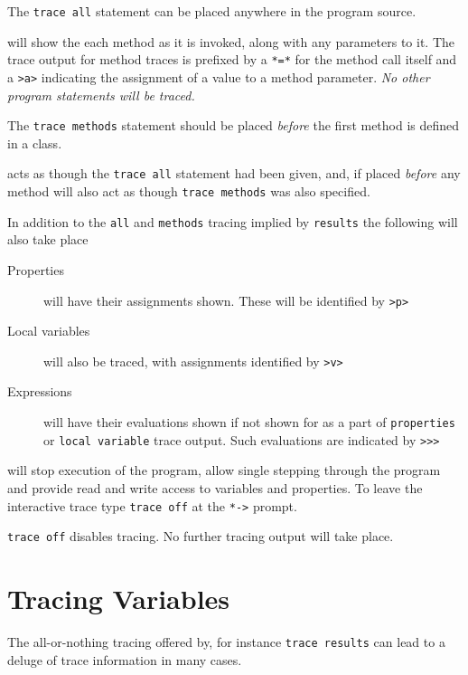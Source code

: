 {\begin{description}
The \texttt{trace all} statement can be placed anywhere in the program source. 

\item[\textbf{methods}] will show the each method as it is invoked, along with any parameters to it. The trace output for method traces is prefixed by a \texttt{*=*} for the method call itself and a \texttt{>a>} indicating the assignment of a value to a method parameter. \textit{No other program statements will be traced.}

The \texttt{trace methods} statement should be placed \textit{before} the first method is defined in a class.

\item[\textbf{results}] acts as though the \texttt{trace all} statement had been given, and, if placed \textit{before} any method will also act as though \texttt{trace methods} was also specified.

In addition to the \texttt{all} and \texttt{methods} tracing implied by \texttt{results} the following will also take place
\begin{description}

\item[Properties] will have their assignments shown. These will be identified by \texttt{>p>}

\item[Local variables] will also be traced, with assignments identified by \texttt{>v>}

\item[Expressions] will have their evaluations shown if not shown for as a part of \texttt{properties} or \texttt{local variable} trace output. Such evaluations are indicated by \texttt{>>>}
\end{description}
\item[\textbf{int}] will stop execution of the \nr{} program, allow single stepping through the program and provide read and write access to variables and properties. 
To leave the interactive trace type \texttt{trace off} at the \texttt{*->} prompt.
\item[\textbf{off}] \texttt{trace off} disables tracing. No further tracing output will take place.
\end{description} 

\section{Tracing Variables}
The all-or-nothing tracing offered by, for instance \texttt{trace results} can lead to a deluge of trace information in many cases.

}
